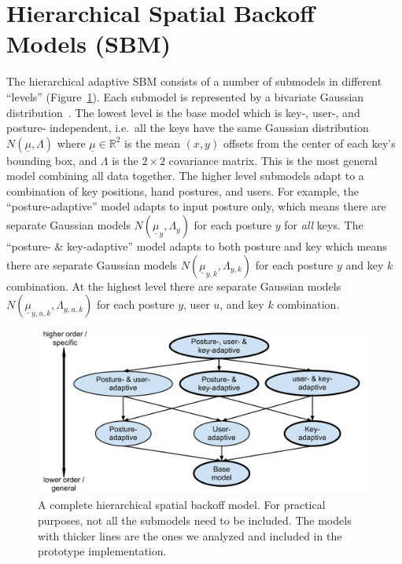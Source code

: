 \documentclass{sigchi}
\begin{document}
\section{Hierarchical Spatial Backoff Models (SBM)}
The hierarchical adaptive SBM consists of a number of submodels in different
``levels'' (Figure~\ref{fig:hierarchy}). Each submodel is represented by a
bivariate Gaussian distribution~\cite{Azenkot:2012,
Goodman:2002, Rashid:2008}.
The lowest level is the base model which is key-, user-, and posture-
independent, i.e.\ all the keys have the same Gaussian
distribution $N(\underline\mu, \Lambda)$ where $\underline\mu \in \mathbb{R}^2$ is the mean
$(x, y)$ offsets from the center of each key's bounding box, and $\Lambda$ is
the $2\times 2$ covariance matrix. This is the most general model combining all 
data together. The higher level submodels adapt to a combination of key
positions,  hand postures, and users. For example, the ``posture-adaptive''
model adapts to input posture only, which means there are separate Gaussian 
models $N(\underline\mu_y, \Lambda_y)$ for each posture $y$ for \textit{all}
keys. The ``posture- \& key-adaptive'' model adapts to both posture and key which means 
there are separate Gaussian models $N(\underline\mu_{y, k}, \Lambda_{y, k})$ for
each posture $y$ and key $k$ combination.  At the highest level there are
separate Gaussian models $N(\underline\mu_{y,u,k},
\Lambda_{y,u,k})$ for each posture $y$, user $u$, and key $k$ combination.

\begin{figure}[tb]
  \centering
  \includegraphics[width=0.9\columnwidth]{figures/hierarchy.pdf}
  \caption{A complete hierarchical spatial backoff model. For practical purposes, not all the submodels need to be included. The models with thicker lines are the ones we analyzed and included in the prototype implementation.}
  \label{fig:hierarchy}
\end{figure}
\end{document}
